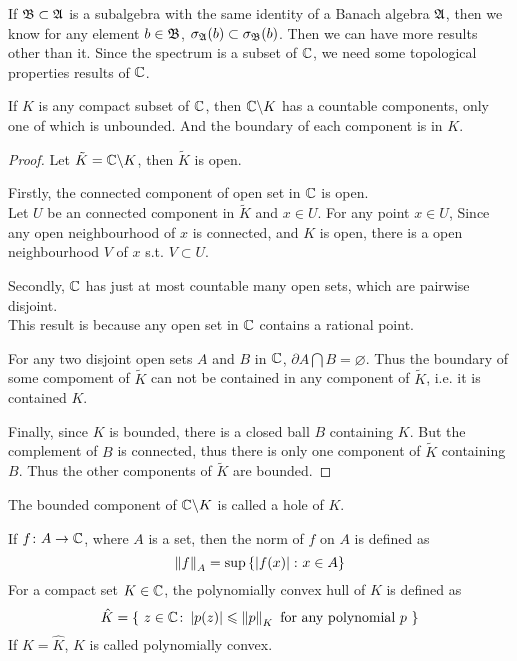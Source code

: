\documentclass[a4paper,11pt]{report}
\begin{document}
If $\mathfrak{B} \subset \mathfrak{A}$ is a subalgebra with the same identity of a Banach algebra $\mathfrak{A}$, then we know for any element $b \in \mathfrak{B}$, $\sigma_{\mathfrak{A}}(b) \subset \sigma_{\mathfrak{B}}(b)$. Then we can have more results other than it. Since the spectrum is a subset of $\mathbb{C}$, we need some topological properties results of $\mathbb{C}$.

\begin{lem}
	If $K$ is any compact subset of $\mathbb{C}$, then $\mathbb{C} \backslash K$ has a countable components, only one of which is unbounded. And the boundary of each component is in $K$.
\end{lem}
\begin{proof}
	Let $\tilde{K} = \mathbb{C} \backslash K$, then $\tilde{K}$ is open.
	\item Firstly, the connected component of open set in $\mathbb{C}$ is open. \\
		  Let $U$ be an connected component in $\tilde{K}$ and $x \in U$. For any point $x \in U$, Since any open neighbourhood of $x$ is connected, and $K$ is open, there is a open neighbourhood $V$ of $x$ s.t. $V \subset U$.
	\item Secondly, $\mathbb{C}$ has just at most countable many open sets, which are pairwise disjoint.\\
		  This result is because any open set in $\mathbb{C}$ contains a rational point.
	\item For any two disjoint open sets $A$ and $B$ in $\mathbb{C}$, $\partial A \bigcap B = \varnothing$. Thus the boundary of some compoment of $\tilde{K}$ can not be contained in any component of $\tilde{K}$, i.e. it is contained $K$.
	\item Finally, since $K$ is bounded, there is a closed ball $B$ containing $K$. But the complement of $B$ is connected, thus there is only one component of $\tilde{K}$ containing $B$. Thus the other components of $\tilde{K}$ are bounded.
\end{proof}
\begin{rem}
	The bounded component of $\mathbb{C} \backslash K$ is called a hole of $K$.
\end{rem}

\begin{defn}
	If $f \colon A \rightarrow \mathbb{C}$, where $A$ is a set, then the norm of $f$ on $A$ is defined as
	\begin{equation*}
		\left\lVert f\right\lVert_A = \sup{\{\left\lvert f(x)\right\lvert \colon x \in A\}}
	\end{equation*}
	For a compact set $K \in \mathbb{C}$, the polynomially convex hull of $K$ is defined as
	\begin{equation*}
		\hat{K} = \{~z \in \mathbb{C} \colon \left\lvert p(z)\right\lvert \leqslant \left\lVert p\right\lVert_K \text{ for any polynomial } p ~\}
	\end{equation*}
	If $K = \hat{K}$, $K$ is called polynomially convex.
\end{defn}
\end{document}
